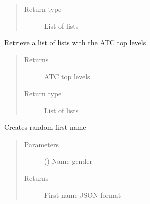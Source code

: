 \documentclass[letterpaper,10pt,english]{sphinxmanual}
\begin{document}
\begin{fulllineitems}
\begin{fulllineitems}
\begin{quote}
\begin{description}
\item[{Return type}] \leavevmode
\sphinxAtStartPar
List of lists

\end{description}\end{quote}

\end{fulllineitems}


\begin{fulllineitems}
\label{\detokenize{CE_app.synth_phr:CE_app.synth_phr.functions.Domains.drugs_atc_top_levels}}
\sphinxAtStartPar
Retrieve a list of lists with the ATC top levels
\begin{quote}\begin{description}
\item[{Returns}] \leavevmode
\sphinxAtStartPar
ATC top levels

\item[{Return type}] \leavevmode
\sphinxAtStartPar
List of lists

\end{description}\end{quote}

\end{fulllineitems}


\begin{fulllineitems}
\label{\detokenize{CE_app.synth_phr:CE_app.synth_phr.functions.Domains.first_name}}
\sphinxAtStartPar
Creates random first name
\begin{quote}\begin{description}
\item[{Parameters}] \leavevmode
\sphinxAtStartPar
{} () \textendash{} Name gender

\item[{Returns}] \leavevmode
\sphinxAtStartPar
First name JSON format


\end{description}
\end{quote}
\end{fulllineitems}
\end{fulllineitems}
\end{document}
